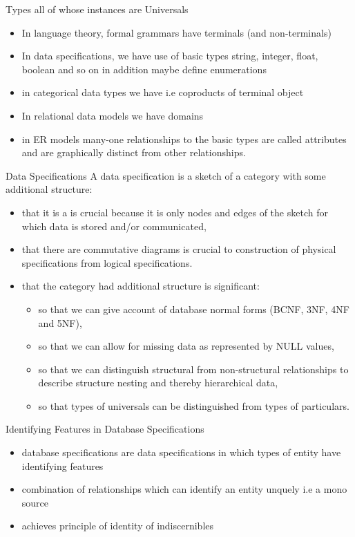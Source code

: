 \documentclass[xcolor=pst,dvips]{beamer}   %
\begin{document}
\begin{frame}{Types all of whose instances are Universals}
\begin{itemize}
\item In language theory, formal grammars have terminals (and non-terminals)
\pause \item In data specifications, we have use of basic types string, integer, float, boolean and so on
              in addition maybe define enumerations 
\pause \item in categorical data types we have  i.e coproducts of terminal object
\pause \item In relational data models we have domains
\pause \item in ER models many-one relationships to the basic types are called attributes and are graphically distinct from other relationships.
\end{itemize}
\end{frame}


\begin{frame}{Data Specifications}
A data specification is a sketch of a category with some additional structure:
\begin{itemize}
\item that it is a  is crucial because it is only nodes and edges of the sketch for which data is stored and/or communicated, 
\item that there are commutative diagrams is crucial to construction of physical 
specifications from logical specifications.
\item that the category had additional structure is significant:
\begin{itemize}
\item so that we can give account of database normal forms 
(BCNF, 3NF, 4NF and 5NF),
\item so that we can allow for missing data as represented by NULL values, 
\item so that we can distinguish structural from non-structural relationships to describe structure nesting and thereby hierarchical data,
\item so that types of universals can be distinguished from types of particulars.
\end{itemize}
\end{itemize}
\end{frame}



\begin{frame}{Identifying Features in Database Specifications}
\begin{itemize}
\item database specifications are data specifications in which types of entity have 
identifying features
\item combination of relationships which can identify an entity unquely
i.e a mono source
\item achieves principle of identity of indiscernibles
\end {itemize}
\end{frame}
\end{document}
